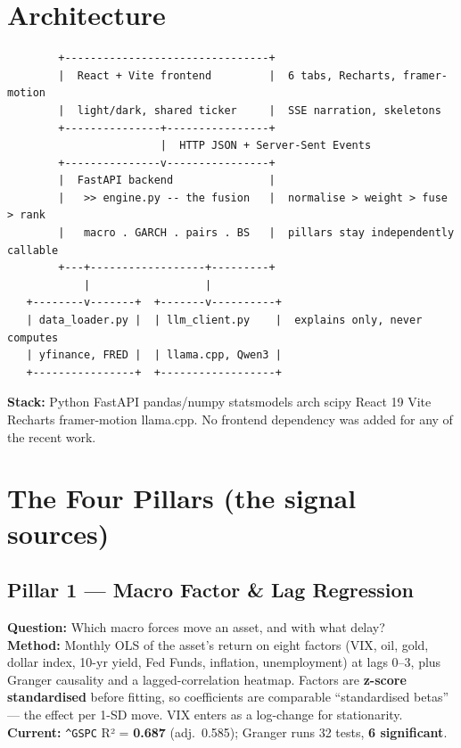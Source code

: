 \documentclass[11pt]{article}
\newcommand{\tk}[1]{\texttt{#1}}
\begin{document}
\section{Architecture}
\begin{Verbatim}
        +--------------------------------+
        |  React + Vite frontend         |  6 tabs, Recharts, framer-motion
        |  light/dark, shared ticker     |  SSE narration, skeletons
        +---------------+----------------+
                        |  HTTP JSON + Server-Sent Events
        +---------------v----------------+
        |  FastAPI backend               |
        |   >> engine.py -- the fusion   |  normalise > weight > fuse > rank
        |   macro . GARCH . pairs . BS   |  pillars stay independently callable
        +---+------------------+---------+
            |                  |
   +--------v-------+  +-------v----------+
   | data_loader.py |  | llm_client.py    |  explains only, never computes
   | yfinance, FRED |  | llama.cpp, Qwen3 |
   +----------------+  +------------------+
\end{Verbatim}

\textbf{Stack:} Python \textbullet{} FastAPI \textbullet{} pandas/numpy \textbullet{}
statsmodels \textbullet{} arch \textbullet{} scipy \textbullet{} React 19 \textbullet{}
Vite \textbullet{} Recharts \textbullet{} framer-motion \textbullet{} llama.cpp. No
frontend dependency was added for any of the recent work.

\section{The Four Pillars (the signal sources)}

\subsection{Pillar 1 — Macro Factor \& Lag Regression}
\textbf{Question:} Which macro forces move an asset, and with what delay? \\
\textbf{Method:} Monthly OLS of the asset's return on eight factors (VIX, oil, gold,
dollar index, 10-yr yield, Fed Funds, inflation, unemployment) at lags 0--3, plus
Granger causality and a lagged-correlation heatmap. Factors are \textbf{z-score
standardised} before fitting, so coefficients are comparable ``standardised betas''
— the effect per 1-SD move. VIX enters as a log-change for stationarity. \\
\textbf{Current:} \tk{\textasciicircum{}GSPC} R² = \textbf{0.687} (adj.\ 0.585);
Granger runs 32 tests, \textbf{6 significant}.
\end{document}
